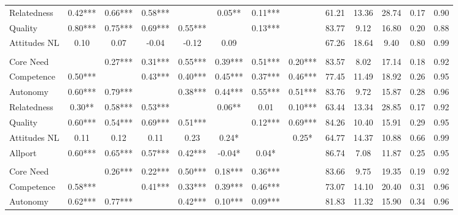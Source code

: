 \begin{table}
\begin{minipage}[t][\textheight][t]{\textwidth}
{\begin{tabular}[t]{lcccccccccccc}
\hspace{1em}Relatedness & 0.42*** & 0.66*** & 0.58*** &  & 0.05** & 0.11*** &  & 61.21 & 13.36 & 28.74 & 0.17 & 0.90\\
\hspace{1em}Quality & 0.80*** & 0.75*** & 0.69*** & 0.55*** &  & 0.13*** &  & 83.77 & 9.12 & 16.80 & 0.20 & 0.88\\
\hspace{1em}Attitudes NL & 0.10 & 0.07 & -0.04 & -0.12 & 0.09 &  &  & 67.26 & 18.64 & 9.40 & 0.80 & 0.99\\
\addlinespace[0.3em]
\multicolumn{13}{l}{\textbf{Study 3}}\\
\hspace{1em}Core Need &  & 0.27*** & 0.31*** & 0.55*** & 0.39*** & 0.51*** & 0.20*** & 83.57 & 8.02 & 17.14 & 0.18 & 0.92\\
\hspace{1em}Competence & 0.50*** &  & 0.43*** & 0.40*** & 0.45*** & 0.37*** & 0.46*** & 77.45 & 11.49 & 18.92 & 0.26 & 0.95\\
\hspace{1em}Autonomy & 0.60*** & 0.79*** &  & 0.38*** & 0.44*** & 0.55*** & 0.51*** & 83.76 & 9.72 & 15.87 & 0.28 & 0.96\\
\hspace{1em}Relatedness & 0.30** & 0.58*** & 0.53*** &  & 0.06** & 0.01 & 0.10*** & 63.44 & 13.34 & 28.85 & 0.17 & 0.92\\
\hspace{1em}Quality & 0.60*** & 0.54*** & 0.69*** & 0.51*** &  & 0.12*** & 0.69*** & 84.26 & 10.40 & 15.91 & 0.29 & 0.95\\
\hspace{1em}Attitudes NL & 0.11 & 0.12 & 0.11 & 0.23 & 0.24* &  & 0.25* & 64.77 & 14.37 & 10.88 & 0.66 & 0.99\\
\hspace{1em}Allport & 0.60*** & 0.65*** & 0.57*** & 0.42*** & -0.04* & 0.04* &  & 86.74 & 7.08 & 11.87 & 0.25 & 0.95\\
\addlinespace[0.3em]
\multicolumn{13}{l}{\textbf{Across Studies}}\\
\hspace{1em}Core Need &  & 0.26*** & 0.22*** & 0.50*** & 0.18*** & 0.36*** &  & 83.66 & 9.75 & 19.35 & 0.19 & 0.92\\
\hspace{1em}Competence & 0.58*** &  & 0.41*** & 0.33*** & 0.39*** & 0.46*** &  & 73.07 & 14.10 & 20.40 & 0.31 & 0.96\\
\hspace{1em}Autonomy & 0.62*** & 0.77*** &  & 0.42*** & 0.10*** & 0.09*** &  & 81.83 & 11.32 & 15.90 & 0.34 & 0.96\\

\end{tabular}}
\end{minipage}
\end{table}
